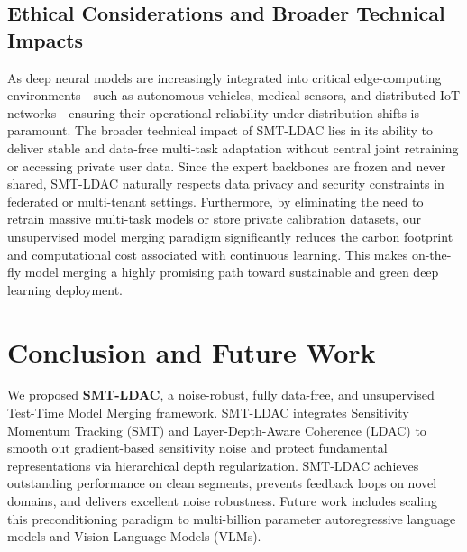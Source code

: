 \documentclass{article}
\theoremstyle{plain}
\theoremstyle{definition}
\theoremstyle{remark}
\begin{document}
\subsection{Ethical Considerations and Broader Technical Impacts}
As deep neural models are increasingly integrated into critical edge-computing environments—such as autonomous vehicles, medical sensors, and distributed IoT networks—ensuring their operational reliability under distribution shifts is paramount. The broader technical impact of SMT-LDAC lies in its ability to deliver stable and data-free multi-task adaptation without central joint retraining or accessing private user data. Since the expert backbones are frozen and never shared, SMT-LDAC naturally respects data privacy and security constraints in federated or multi-tenant settings. Furthermore, by eliminating the need to retrain massive multi-task models or store private calibration datasets, our unsupervised model merging paradigm significantly reduces the carbon footprint and computational cost associated with continuous learning. This makes on-the-fly model merging a highly promising path toward sustainable and green deep learning deployment.

\section{Conclusion and Future Work}
\label{sec:conclusion}
We proposed \textbf{SMT-LDAC}, a noise-robust, fully data-free, and unsupervised Test-Time Model Merging framework. SMT-LDAC integrates Sensitivity Momentum Tracking (SMT) and Layer-Depth-Aware Coherence (LDAC) to smooth out gradient-based sensitivity noise and protect fundamental representations via hierarchical depth regularization. SMT-LDAC achieves outstanding performance on clean segments, prevents feedback loops on novel domains, and delivers excellent noise robustness. Future work includes scaling this preconditioning paradigm to multi-billion parameter autoregressive language models and Vision-Language Models (VLMs).

\clearpage


\end{document}
